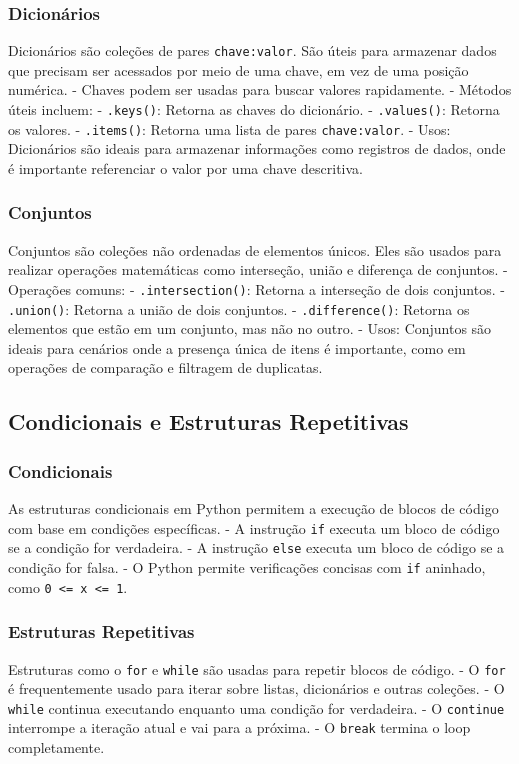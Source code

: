 \documentclass{sciposter}
\begin{document}
\begin{multicols}{3}
\subsubsection{Dicionários}
Dicionários são coleções de pares \texttt{chave:valor}. São úteis para armazenar dados que precisam ser acessados por meio de uma chave, em vez de uma posição numérica.
- Chaves podem ser usadas para buscar valores rapidamente.
- Métodos úteis incluem:
  - \texttt{.keys()}: Retorna as chaves do dicionário.
  - \texttt{.values()}: Retorna os valores.
  - \texttt{.items()}: Retorna uma lista de pares \texttt{chave:valor}.
- Usos: Dicionários são ideais para armazenar informações como registros de dados, onde é importante referenciar o valor por uma chave descritiva.

\subsubsection{Conjuntos}
Conjuntos são coleções não ordenadas de elementos únicos. Eles são usados para realizar operações matemáticas como interseção, união e diferença de conjuntos.
- Operações comuns:
  - \texttt{.intersection()}: Retorna a interseção de dois conjuntos.
  - \texttt{.union()}: Retorna a união de dois conjuntos.
  - \texttt{.difference()}: Retorna os elementos que estão em um conjunto, mas não no outro.
- Usos: Conjuntos são ideais para cenários onde a presença única de itens é importante, como em operações de comparação e filtragem de duplicatas.

\subsection{Condicionais e Estruturas Repetitivas}

\subsubsection{Condicionais}
As estruturas condicionais em Python permitem a execução de blocos de código com base em condições específicas.
- A instrução \texttt{if} executa um bloco de código se a condição for verdadeira.
- A instrução \texttt{else} executa um bloco de código se a condição for falsa.
- O Python permite verificações concisas com \texttt{if} aninhado, como \texttt{0 <= x <= 1}.

\subsubsection{Estruturas Repetitivas}
Estruturas como o \texttt{for} e \texttt{while} são usadas para repetir blocos de código.
- O \texttt{for} é frequentemente usado para iterar sobre listas, dicionários e outras coleções.
- O \texttt{while} continua executando enquanto uma condição for verdadeira.
- O \texttt{continue} interrompe a iteração atual e vai para a próxima.
- O \texttt{break} termina o loop completamente.


\end{multicols}
\end{document}
